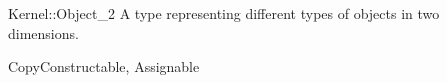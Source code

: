 \begin{ccRefConcept}{Kernel::Object_2}
A type representing different types of objects in two dimensions.

\ccRefines
CopyConstructable, Assignable 

\ccSeeAlso
{} \\
\\
 \\
 \\

\end{ccRefConcept}
